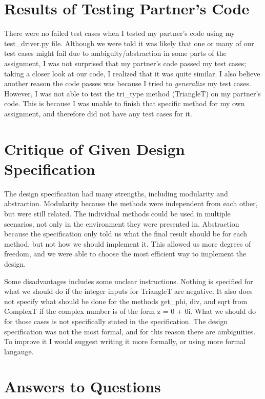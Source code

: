 \documentclass[12pt]{article}
\begin{document}
\section{Results of Testing Partner's Code}

There were no failed test cases when I tested my partner's code using my test\_driver.py file. Although we were told it was likely that one or many of our test cases might fail due to ambiguity/abstraction in some parts of the assignment, I was not surprised that my partner's code passed my test cases; taking a closer look at our code, I realized that it was quite similar. I also believe another reason the code passes was because I tried to \emph{generalize} my test cases. However, I was not able to test the tri\_type method (TriangleT) on my partner's code. This is because I was unable to finish that specific method for my own assignment, and therefore did not have any test cases for it. 

\section{Critique of Given Design Specification}

The design specification had many strengths, including modularity and abstraction. Modularity because the methods were independent from each other, but were still related. The individual methods could be used in multiple scenarios, not only in the environment they were presented in. Abstraction because the specification only told us what the final result should be for each method, but not how we should implement it. This allowed us more degrees of freedom, and we were able to choose the most efficient way to implement the design.

Some disadvantages includes some unclear instructions. Nothing is specified for what we should do if the integer inputs for TriangleT are negative. It also does not specify what should be done for the methods get\_phi, div, and sqrt from ComplexT if the complex number is of the form z = 0 + 0i. What we should do for those cases is not specifically stated in the specification. The design specification was not the most formal, and for this reason there are ambiguities. To improve it I would suggest writing it more formally, or using more formal langauge.

\section{Answers to Questions}
\end{document}
